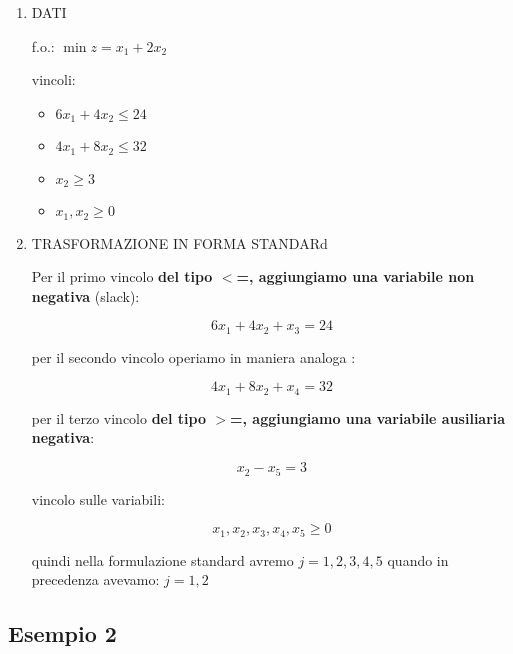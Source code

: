 \begin{enumerate}
	\item DATI
	
		f.o.: $\min z= x_1 + 2 x_2$

		vincoli:

		\begin{itemize}
			\item $6x_1 + 4x_2 \leq 24$
			\item $4x_1 + 8x_2 \leq 32$
			\item $x_2 \geq 3$
			\item $x_1, x_2 \geq 0$
		\end{itemize}
		
	\item TRASFORMAZIONE IN FORMA STANDARd
	
		Per il primo vincolo \textbf{del tipo $<$=, aggiungiamo una variabile non negativa} (slack):

		$$6x_1 + 4x_2 + x_3 = 24$$

		per il secondo vincolo operiamo in maniera analoga :

		$$4x_1 + 8x_2 + x_4 = 32$$

		per il terzo vincolo \textbf{del tipo $>$=, aggiungiamo una variabile ausiliaria negativa}:
		
		$$x_2 - x_5 = 3$$

		vincolo sulle variabili:

		$$x_1, x_2, x_3, x_4, x_5 \geq 0$$

		quindi nella formulazione standard avremo $j = 1,2,3,4,5$ quando in precedenza avevamo: $j = 1, 2$
	
\end{enumerate}


\subsection{Esempio 2}

